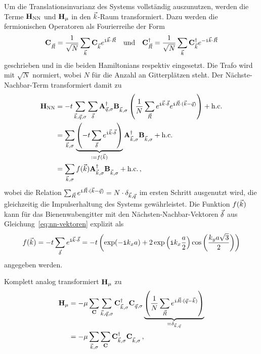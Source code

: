 Um die Translationsinvarianz des Systems vollständig auszunutzen, werden die Terme $\mathbf{H}_{\mathrm{NN}}$ und $\mathbf{H}_\mu$ in den ${\vec{k}}$-Raum transformiert. 
Dazu werden die fermionischen Operatoren als Fourierreihe der Form
\begin{align}
    \oc{\vec{R}} = \frac{1}{\sqrt{N}} \sum_{\vk} \oc{\vk} e^{\im \vk \cdot \vec{R}} & & \text{und} & & \ocd{\vec{R}} = \frac{1}{\sqrt{N}} \sum_{\vk} \ocd{\vk} e^{-\im \vk \cdot \vec{R}}
\end{align}
geschrieben und in die beiden Hamiltonians respektiv eingesetzt. 
Die Trafo wird mit $\sqrt{N}$ normiert, wobei $N$ für die Anzahl an Gitterplätzen steht.
Der Nächste-Nachbar-Term transformiert damit zu
\begin{align}
    \oHNN &= -t \sum_{\vk,\vq, \sigma} \sum_{\vdelta} \oad{\vq, \sigma}\obk \left(\frac{1}{N}\sum_{\vec{R}} e^{\im \vk \cdot \vdelta} e^{\im \vec{R} \cdot (\vk - \vq)}\right) + \hc\\
    &= \sum_{\vk, \sigma} \underbrace{\left(-t \sum_{\vdelta} e^{\im \vk \cdot \vdelta} \right)}_{:= f(\vk)} \oakd \obk + \hc \\
    &= \sum_{\vk, \sigma} f(\vk) \oakd \obk + \hc \, ,
\end{align}
wobei die Relation $\sum_{\vec{R}} e^{\texttt{i} \vec{R} \cdot ({\vec{k}} - {\vec{q}})} = N \cdot \delta_{{\vec{k}}, {\vec{q}}}$ im ersten Schritt ausgenutzt wird, die gleichzeitig die Impulserhaltung des Systems gewährleistet.
Die Funktion $f({\vec{k}})$ kann für das Bienenwabengitter mit den Nächsten-Nachbar-Vektoren ${\vec{\delta}}$ aus Gleichung~\eqref{eq:nn-vektoren} explizit als
\begin{align}
    f({\vec{k}}) = -t \sum_{{\vec{\delta}}} e^{\texttt{i} {\vec{k}} \cdot {\vec{\delta}}} = -t \left(\mathrm{exp}(-\texttt{i} k_x a) + 2 \, \mathrm{exp}\left(\texttt{i} k_x \frac{a}{2}\right) \cos\left(\frac{k_y a \sqrt{3}}{2}\right)\right) \label{eq:f(k)}
\end{align}
angegeben werden. 

Komplett analog transformiert $\mathbf{H}_\mu$ zu 
\begin{align}
    \oH_\mu &= -\mu \sum_\oC \sum_{\vk, \vq, \sigma} \ocd{\vk, \sigma} \oc{\vq, \sigma} \underbrace{\left(\frac{1}{N} \sum_{\vec{R}} e^{\im \vec{R} \cdot (\vq - \vk)}\right)}_{=\delta_{\vk, \vq}} \\
    &= - \mu \sum_{\vk, \sigma} \sum_\oC \ocd{\vk, \sigma} \oc{\vk, \sigma} \, ,
\end{align}

